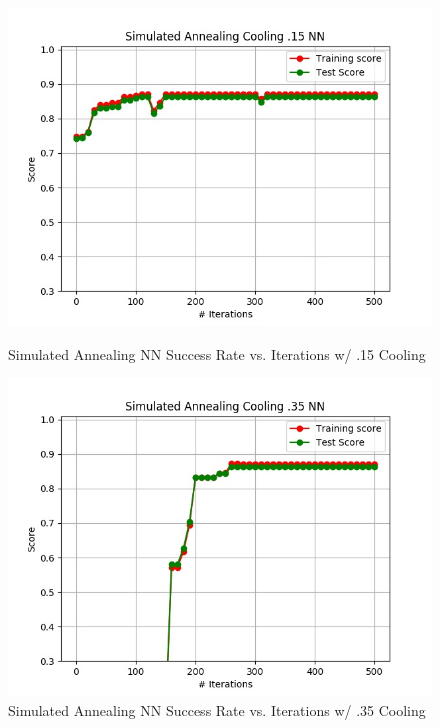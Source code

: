 \documentclass[h]{article}
\begin{document}
 \begin{figure}[H]
      \includegraphics[width=1\textwidth,keepaspectratio]{simulated_annealing_cooling_pt15_nn.jpg} 
      \caption*{Simulated Annealing NN Success Rate vs. Iterations w/ .15 Cooling} 
   \endminipage\hfill
      \includegraphics[width=1\textwidth,keepaspectratio]{simulated_annealing_cooling_pt35_nn.jpg} 
      \caption*{Simulated Annealing NN Success Rate vs. Iterations w/ .35 Cooling} 
   \endminipage\hfill
\end{figure}
\end{document}
